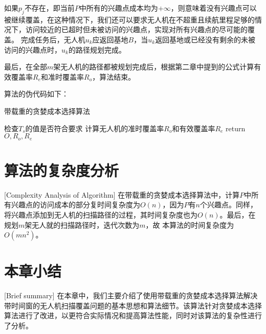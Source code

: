 如果$p_j$不存在，即当前$P$中所有的兴趣点成本均为$+\infty$，则意味着没有兴趣点可以被继续覆盖，在这种情况下，我们还可以要求无人机在不超重且续航里程足够的情况下，访问较近的已超时但未被访问的兴趣点，实现对所有兴趣点的尽可能的覆盖。
完成任务后，无人机$u_k$应返回基地$B$，当$u_k$返回基地或已经没有剩余的未被访问的兴趣点时，$u_k$的路径规划完成。


最后，在全部$m$架无人机的路径都被规划完成后，根据第二章中提到的公式计算有效覆盖率$R_e$和准时覆盖率$R_o$，算法结束。


算法的伪代码如下：
 
\begin{algorithm}[H]  %
	\caption{带载重的贪婪成本选择算法}%
	\LinesNumbered %
	检查$T_s$的值是否符合要求\; %
	计算无人机的准时覆盖率$R_o$和有效覆盖率$R_e$\;
	return $O,R_o,R_e$
\end{algorithm}


\section{算法的复杂度分析}[Complexity Analysis of Algorithm]
在带载重的贪婪成本选择算法中，计算$P$中所有兴趣点的访问成本的部分复时间复杂度为$O(n)$，因为$P$有$n$个兴趣点。同样，将兴趣点添加到无人机的扫描路径的过程，其时间复杂度也为$O(n)$。最后，在规划$m$架无人就的扫描路径时，迭代次数为$m$，故
本算法的时间复杂度为$O(mn^2)$。


\section{本章小结}[Brief summary]
在本章中，我们主要介绍了使用带载重的贪婪成本选择算法解决带时间窗的无人机扫描覆盖问题的基本思想和算法细节。该算法针对贪婪成本选择算法进行了改进，以更符合实际情况和提高算法性能，同时对该算法的复杂性进行了分析。